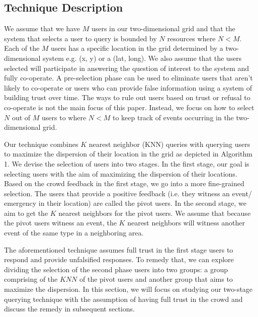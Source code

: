 \documentclass{acm_proc_article-sp}
\begin{document}
\subsection{Technique Description}
We assume that we have $M$ users in our two-dimensional grid and that the system that selects a user to query is bounded by $N$ resources where $N < M$.  Each of the $M$ users has a specific location in the grid determined by a two-dimensional system e.g. (x, y) or a (lat, long). We also assume that the users selected will participate in answering the question of interest to the system and fully co-operate. A pre-selection phase can be used to eliminate users that aren't likely to co-operate or users who can provide false information using a system of building trust over time. The ways to rule out users based on trust or refusal to co-operate is not the main focus of this paper. Instead, we focus on how to select $N$ out of $M$ users to  where $N < M$ to keep track of events occurring in the two-dimensional grid.\par
Our technique combines $K$ nearest neighbor (KNN) queries with querying users to maximize the dispersion of their location in the grid as depicted in Algorithm 1. We devise the selection of users into two stages. In the first stage, our goal is selecting users with the aim of maximizing the dispersion of their locations. Based on the crowd feedback in the first stage, we go into a more fine-grained selection. The users that provide a positive feedback (i.e. they witness an event/ emergency in their location) are called the pivot users. In the second stage, we aim to get the $K$ nearest neighbors for the pivot users. We assume that because the pivot users witness an event, the $K$ nearest neighbors will witness another event of the same type in a neighboring area. \par
The aforementioned technique assumes full trust in the first stage users to respond and provide unfalsified responses. To remedy that, we can explore dividing the selection of the second phase users into two groups: a group comprising of the $KNN$ of the pivot users and another group that aims to maximize the dispersion. In this section, we will focus on studying our two-stage querying technique with the assumption of having full trust in the crowd and discuss the remedy in subsequent sections.\par  
\end{document}
